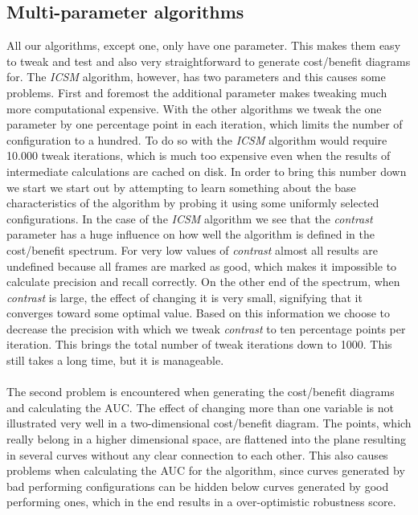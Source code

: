 \subsection{Multi-parameter algorithms}\label{sec:ph1multiparameter}
%
All our algorithms, except one, only have one parameter. This makes them easy to tweak and test and also very straightforward to generate cost/benefit diagrams for. The \textit{ICSM} algorithm, however, has two parameters and this causes some problems. First and foremost the additional parameter makes tweaking much more computational expensive. With the other algorithms we tweak the one parameter by one percentage point in each iteration, which limits the number of configuration to a hundred. To do so with the \textit{ICSM} algorithm would require 10.000 tweak iterations, which is much too expensive even when the results of intermediate calculations are cached on disk. In order to bring this number down we start we start out by attempting to learn something about the base characteristics of the algorithm by probing it using some uniformly selected configurations. In the case of the \textit{ICSM} algorithm we see that the \textit{contrast} parameter has a huge influence on how well the algorithm is defined in the cost/benefit spectrum. For very low values of \textit{contrast} almost all results are undefined because all frames are marked as good, which makes it impossible to calculate precision and recall correctly. On the other end of the spectrum, when \textit{contrast} is large, the effect of changing it is very small, signifying that it converges toward some optimal value. Based on this information we choose to decrease the precision with which we tweak \textit{contrast} to ten percentage points per iteration. This brings the total number of tweak iterations down to 1000. This still takes a long time, but it is manageable.\\
\\
The second problem is encountered when generating the cost/benefit diagrams and calculating the AUC. The effect of changing more than one variable is not illustrated very well in a two-dimensional cost/benefit diagram. The points, which really belong in a higher dimensional space, are flattened into the plane resulting in several curves without any clear connection to each other. This also causes problems when calculating the AUC for the algorithm, since curves generated by bad performing configurations can be hidden below curves generated by good performing ones, which in the end results in a over-optimistic robustness score.
